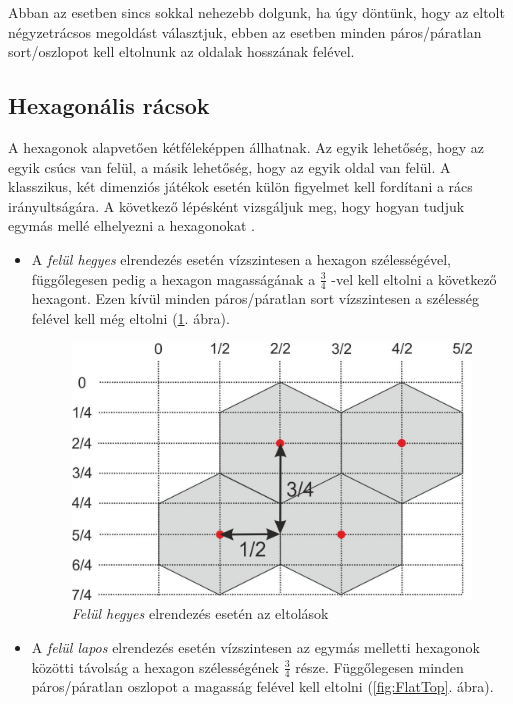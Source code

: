 Abban az esetben sincs sokkal nehezebb dolgunk, ha úgy döntünk, hogy az eltolt négyzetrácsos megoldást választjuk, ebben az esetben minden páros/páratlan sort/oszlopot kell eltolnunk az oldalak hosszának felével.

\subsection{Hexagonális rácsok}

A hexagonok alapvetően kétféleképpen állhatnak. Az egyik lehetőség, hogy az egyik csúcs van felül, a másik lehetőség, hogy az egyik oldal van felül. A klasszikus, két dimenziós játékok esetén külön figyelmet kell fordítani a rács irányultságára. A következő lépésként vizsgáljuk meg, hogy hogyan tudjuk egymás mellé elhelyezni a hexagonokat \cite{redblobgamesHexagonalGrids}.
\begin{itemize}
    \item A \textit{felül hegyes} elrendezés esetén vízszintesen a hexagon szélességével, függőlegesen pedig a hexagon magasságának a $\frac{3}{4}$ -vel kell eltolni a következő hexagont. Ezen kívül minden páros/páratlan sort vízszintesen a szélesség felével kell még eltolni (\ref{fig:PointyTop}. ábra).
    
\begin{figure}[h!]
\centering
\includegraphics[scale=1.0]{kepek/PointyTop.jpg}
\caption{\textit{Felül hegyes} elrendezés esetén az eltolások}
\label{fig:PointyTop}
\end{figure}

    \item A \textit{felül lapos} elrendezés esetén vízszintesen az egymás melletti hexagonok közötti távolság a hexagon szélességének $\frac{3}{4}$ része. Függőlegesen minden páros/páratlan oszlopot a magasság felével kell eltolni (\ref{fig:FlatTop}. ábra).
\end{itemize}


